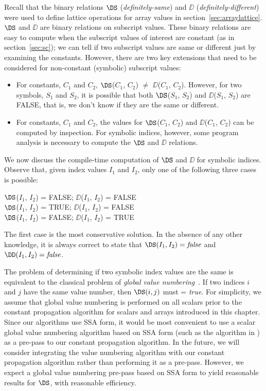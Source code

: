 Recall that the binary relations $\DS$ ({\it definitely-same})
and $\DD$ ({\it definitely-different}) were used to define
lattice operations for array values
in section~\ref{sec:arraylattice}.
$\DS$ and $\DD$ are binary relations on subscript values.
These binary relations are easy to compute
when the subscript values of interest are constant (as in section~\ref{sec:sc}); we can tell if two subscript values are same or different just by
examining the constants.
However, there are two key extensions that need to be considered
for non-constant (symbolic) subscript values:
\begin{itemize}

\item  For constants, $C_1$ and $C_2$, $\DS$($C_1$, $C_2$) $\neq$ 
$\DD$($C_1$, $C_2$). However, for two symbols,  $S_1$ and $S_2$,
it is possible that both $\DS$($S_1$, $S_2$) and $\DD$($S_1$,
$S_2$) are FALSE, that is, we don't know if they are the same or different.

\item For constants, $C_1$ and $C_2$, the values for $\DS$($C_1$, $C_2$) and 
$\DD$($C_1$, $C_2$) can be computed by inspection. For symbolic
indices, however, some program analysis is necessary
to compute the $\DS$ and $\DD$ relations.
\end{itemize} 

We now discuss the compile-time
computation of $\DS$ and $\DD$ for symbolic
indices. 
Observe that,
given index values $I_1$ and $I_2$, only one of the following three cases
is possible:
\begin{center}
\parbox{3.0in}{
\begin{programa}
$\DS$($I_1$, $I_2$) = FALSE; $\DD$($I_1$, $I_2$) = FALSE \\
$\DS$($I_1$, $I_2$) = TRUE; $\DD$($I_1$, $I_2$) = FALSE \\
$\DS$($I_1$, $I_2$) = FALSE; $\DD$($I_1$, $I_2$) = TRUE \\
\end{programa}
}
\end{center}
The first case is the most conservative solution.  In the absence of
any other knowledge, it is always correct to state that
$\DS(I_1,I_2) = \mbox{\it false}$ and $\DD(I_1,I_2) = \mbox{\it
false}$.

The problem of determining
if two symbolic index values are the same is equivalent to the
classical problem of {\it global value numbering}~\cite{AlWZ88,Much97}. If two indices $i$
and $j$ have the same value number, then $\DS(i,j)$ must = {\it true}.
For simplicity, we assume that global value numbering is performed on
all scalars prior to the constant propagation algorithm for scalars
and arrays introduced in this chapter.  Since our algorithms use SSA
form, it would be most convenient to use a scalar global value
numbering algorithm based on SSA form (such as the algorithm in
\cite{AlWZ88}) as a pre-pass to our constant propagation algorithm.
In the future, we will consider integrating the value numbering
algorithm with our constant propagation algorithm rather than
performing it as a pre-pass.
However,
we expect a global value numbering pre-pass based on SSA form
to yield reasonable results for
$\DS$, with reasonable efficiency. 

